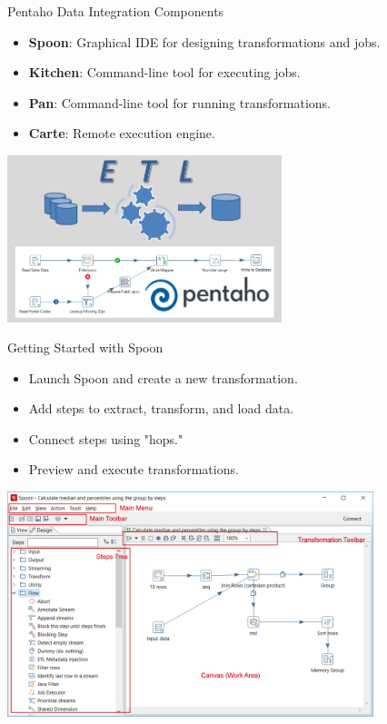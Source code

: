 \documentclass{beamer}
\begin{document}
\begin{frame}{Pentaho Data Integration Components}
    \begin{itemize}
        \item \textbf{Spoon}: Graphical IDE for designing transformations and jobs.
        \item \textbf{Kitchen}: Command-line tool for executing jobs.
        \item \textbf{Pan}: Command-line tool for running transformations.
        \item \textbf{Carte}: Remote execution engine.
    \end{itemize}
    \centering
    \vspace{5mm}
    \includegraphics[width=0.6\textwidth]{figures/pdi_components}  %
\end{frame}

\begin{frame}{Getting Started with Spoon}
    \begin{itemize}
        \item Launch Spoon and create a new transformation.
        \item Add steps to extract, transform, and load data.
        \item Connect steps using "hops."
        \item Preview and execute transformations.
    \end{itemize}
    \vspace{2mm}
    \centering
    \includegraphics[width=0.8\textwidth]{figures/spoon_ui.png}  %
\end{frame}
\end{document}
